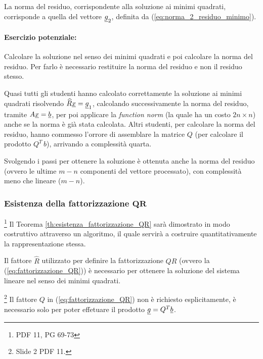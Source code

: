 \begin{remark}
    La norma del residuo, corrispondente alla soluzione ai minimi quadrati, corrisponde a quella del vettore $\uline g_2$, definita da (\ref{eq:norma_2_residuo_minimo}).
\end{remark}

\paragraph{Esercizio potenziale:}{Calcolare la soluzione nel senso dei minimi quadrati e poi calcolare la norma del residuo. Per farlo è necessario restituire la norma del residuo e non il residuo stesso. 

Quasi tutti gli studenti hanno calcolato correttamente la soluzione ai minimi quadrati risolvendo $\widehat R\uline x=\uline g_1$, calcolando successivamente la norma del residuo, tramite $A\uline x=\uline b$, per poi applicare la \textit{function norm} (la quale ha un costo $2n\times n$) anche se la norma è già stata calcolata. Altri studenti, per calcolare la norma del residuo, hanno commesso l'orrore di assemblare la matrice $Q$ (per calcolare il prodotto $Q^T\,b$), arrivando a complessità quarta. 

Svolgendo i passi per ottenere la soluzione è ottenuta anche la norma del residuo (ovvero le ultime $m-n$ componenti del vettore processato), con complessità meno che lineare ($m-n$).}

\subsubsection{Esistenza della fattorizzazione \texorpdfstring{$\boldsymbol {QR}$}{QR}}\label{sssec:esistenza_fattorizzazione_QR}
\footnote{PDF 11, PG 69-73}
Il Teorema \ref{th:esistenza_fattorizzazione_QR} sarà dimostrato in modo costruttivo attraverso un algoritmo, il quale servirà a costruire quantitativamente la rappresentazione stessa.

Il fattore $\widehat R$ utilizzato per definire la fattorizzazione $QR$ (ovvero la (\ref{eq:fattorizzazione_QR})) è necessario per ottenere la soluzione del sistema lineare nel senso dei minimi quadrati.

\begin{remark}\footnote{Slide 2 PDF 11.}
    Il fattore $Q$ in (\ref{eq:fattorizzazione_QR}) non è richiesto esplicitamente, è necessario solo per poter effetuare il prodotto $\uline g = Q^T\uline b$.
\end{remark}

